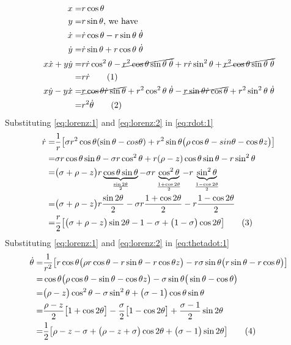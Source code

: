 \documentclass[]{article}
\newcommand\numberthis{\addtocounter{equation}{1}\tag{\theequation}}
\begin{document}
\begin{align*}
	x =& r \cos \theta\\
	y =& r \sin \theta \text{, we have}\\
	\dot{x} =& \dot{r} \cos \theta - r \sin\theta \; \dot{\theta}\\
	\dot{y} =& \dot{r} \sin \theta + r \cos\theta \; \dot{\theta}\\
	x\dot{x}+ y\dot{y} =& r  \dot{r} \cos^2 \theta -  \cancel{r^2 \cos \theta \sin\theta \; \dot{\theta}}+  r \dot{r} \sin^2 \theta + \cancel{ r^2 \cos\theta \sin \theta \; \dot{\theta}}\\
	=& r \dot{r} \numberthis \label{eq:rdot:1}\\
	x\dot{y}-y\dot{x}=& \cancel{r \cos \theta \dot{r} \sin \theta} +r^2 \cos^2 \theta  \; \dot{\theta} -\cancel{r \sin \theta \dot{r} \cos \theta} + r^2 \sin^2 \theta  \; \dot{\theta}\\
	=& r^2 \dot{\theta} \numberthis \label{eq:thetadot:1}
\end{align*}
Substituting  \eqref{eq:lorenz:1} and \eqref{eq:lorenz:2} in \eqref{eq:rdot:1}
\begin{align*}
	\dot r =& \frac{1}{r}\big[\sigma r^2 \cos \theta (\sin\theta-cos\theta) +  r^2 \sin \theta \big(\rho \cos\theta -sin\theta - \cos \theta z\big)\big]\\
	=& \sigma r \cos \theta \sin\theta -\sigma r \cos^2 \theta + r (\rho-z) \cos\theta \sin \theta-r \sin^2 \theta \\
	=& \big(\sigma +\rho -z \big)r \underbrace{\cos \theta \sin\theta}_\text{$\frac{\sin 2\theta}{2}$} -\sigma r \underbrace{\cos^2 \theta}_\text{$\frac{1+\cos 2\theta}{2}$}-r \underbrace{\sin^2 \theta}_\text{$\frac{1-\cos 2\theta}{2}$}\\
	=&  \big(\sigma +\rho -z \big)r \frac{\sin 2\theta}{2} - \sigma r \frac{1+\cos 2\theta}{2} -r \frac{1-\cos 2\theta}{2}\\
	=& \frac{r}{2}\big[\big(\sigma +\rho -z \big)\sin 2\theta - 1 -\sigma + \big(1-\sigma\big) \cos 2\theta\big] \numberthis \label{eq:lorenz:polar:r}
\end{align*}
Substituting  \eqref{eq:lorenz:1} and \eqref{eq:lorenz:2} in \eqref{eq:thetadot:1}
\begin{align*}
	 \dot{\theta} =& \frac{1}{r^2}\big[ r \cos \theta\big(\rho r \cos \theta -r \sin \theta - r \cos \theta z\big) - r \sigma \sin\theta \big(r \sin \theta-r \cos \theta\big) \big]\\
	  =& \cos \theta\big(\rho  \cos \theta - \sin \theta - \cos \theta z\big) -  \sigma \sin\theta \big( \sin \theta- \cos \theta\big)\\
	  =& \big(\rho-z  \big) \cos^2 \theta - \sigma \sin^2 \theta + \big( \sigma-1 \big) \cos \theta \sin \theta\\
	  =& \frac{\rho-z }{2}\big[1 + \cos 2 \theta\big] - \frac{\sigma}{2}\big[1 - \cos 2 \theta\big]+\frac{\sigma-1}{2} \sin 2 \theta\\
	  =& \frac{1}{2}\big[\rho-z -\sigma + \big(\rho-z +\sigma\big)\cos 2 \theta + \big(\sigma-1\big) \sin 2 \theta\big] \numberthis \label{eq:lorenz:polar:theta}
\end{align*}
\end{document}
